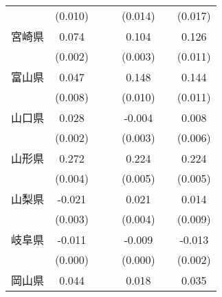 \begin{table}[htbp]
\begin{tabular}{l*{6}{c}}
                    &     (0.010)         &                     &                     &     (0.014)         &                     &     (0.017)         \\
宮崎県              &       0.074\sym{***}&                     &                     &       0.104\sym{***}&                     &       0.126\sym{***}\\
                    &     (0.002)         &                     &                     &     (0.003)         &                     &     (0.011)         \\
富山県              &       0.047\sym{***}&                     &                     &       0.148\sym{***}&                     &       0.144\sym{***}\\
                    &     (0.008)         &                     &                     &     (0.010)         &                     &     (0.011)         \\
山口県              &       0.028\sym{***}&                     &                     &      -0.004         &                     &       0.008         \\
                    &     (0.002)         &                     &                     &     (0.003)         &                     &     (0.006)         \\
山形県              &       0.272\sym{***}&                     &                     &       0.224\sym{***}&                     &       0.224\sym{***}\\
                    &     (0.004)         &                     &                     &     (0.005)         &                     &     (0.005)         \\
山梨県              &      -0.021\sym{***}&                     &                     &       0.021\sym{***}&                     &       0.014         \\
                    &     (0.003)         &                     &                     &     (0.004)         &                     &     (0.009)         \\
岐阜県              &      -0.011\sym{***}&                     &                     &      -0.009\sym{***}&                     &      -0.013\sym{***}\\
                    &     (0.000)         &                     &                     &     (0.000)         &                     &     (0.002)         \\
岡山県              &       0.044\sym{***}&                     &                     &       0.018\sym{***}&                     &       0.035\sym{***}\\

\end{tabular}
\end{table}
